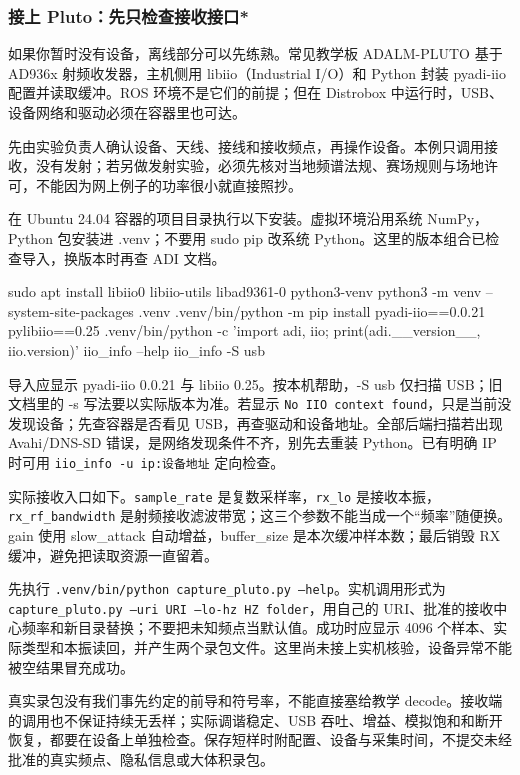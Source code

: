 \subsubsection{接上 Pluto：先只检查接收接口*}
如果你暂时没有设备，离线部分可以先练熟。常见教学板 ADALM-PLUTO 基于 AD936x 射频收发器，主机侧用 libiio（Industrial I/O）和 Python 封装 pyadi-iio 配置并读取缓冲。ROS 环境不是它们的前提；但在 Distrobox 中运行时，USB、设备网络和驱动必须在容器里也可达。
\begin{note}
先由实验负责人确认设备、天线、接线和接收频点，再操作设备。本例只调用接收，没有发射；若另做发射实验，必须先核对当地频谱法规、赛场规则与场地许可，不能因为网上例子的功率很小就直接照抄。
\end{note}
\begin{example}[把安装和设备可达分开检查]
在 Ubuntu 24.04 容器的项目目录执行以下安装。虚拟环境沿用系统 NumPy，Python 包安装进 .venv；不要用 sudo pip 改系统 Python。这里的版本组合已检查导入，换版本时再查 ADI 文档。
\begin{sdrblock}
\begin{tbash}
sudo apt install libiio0 libiio-utils libad9361-0 python3-venv
python3 -m venv --system-site-packages .venv
.venv/bin/python -m pip install pyadi-iio==0.0.21 pylibiio==0.25
.venv/bin/python -c 'import adi, iio; print(adi.__version__, iio.version)'
iio_info --help
iio_info -S usb
\end{tbash}
\end{sdrblock}
导入应显示 pyadi-iio 0.0.21 与 libiio 0.25。按本机帮助，-S usb 仅扫描 USB；旧文档里的 -s 写法要以实际版本为准。若显示 \texttt{No IIO context found}，只是当前没发现设备；先查容器是否看见 USB，再查驱动和设备地址。全部后端扫描若出现 Avahi/DNS-SD 错误，是网络发现条件不齐，别先去重装 Python。已有明确 IP 时可用 \texttt{iio\_info -u ip:设备地址} 定向检查。

实际接收入口如下。\texttt{sample\_rate} 是复数采样率，\texttt{rx\_lo} 是接收本振，\texttt{rx\_rf\_bandwidth} 是射频接收滤波带宽；这三个参数不能当成一个“频率”随便换。gain 使用 slow\_attack 自动增益，buffer\_size 是本次缓冲样本数；最后销毁 RX 缓冲，避免把读取资源一直留着。
\begin{sdrblock}

\end{sdrblock}
先执行 \texttt{.venv/bin/python capture\_pluto.py --help}。实机调用形式为 \texttt{capture\_pluto.py --uri URI --lo-hz HZ folder}，用自己的 URI、批准的接收中心频率和新目录替换；不要把未知频点当默认值。成功时应显示 4096 个样本、实际类型和本振读回，并产生两个录包文件。这里尚未接上实机核验，设备异常不能被空结果冒充成功。

真实录包没有我们事先约定的前导和符号率，不能直接塞给教学 decode。接收端的调用也不保证持续无丢样；实际调谐稳定、USB 吞吐、增益、模拟饱和和断开恢复，都要在设备上单独检查。保存短样时附配置、设备与采集时间，不提交未经批准的真实频点、隐私信息或大体积录包。
\end{example}
